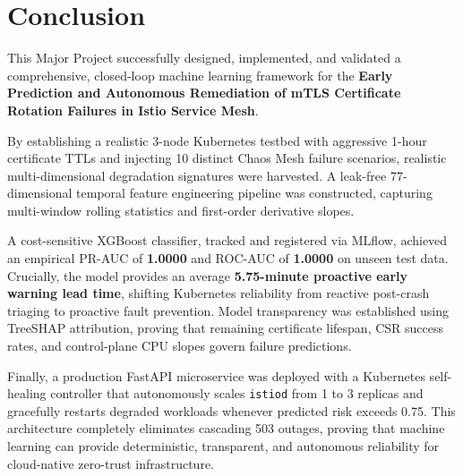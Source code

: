 \documentclass[12pt,a4paper]{report}
\begin{document}
\section{Conclusion}
This Major Project successfully designed, implemented, and validated a comprehensive, closed-loop machine learning framework for the \textbf{Early Prediction and Autonomous Remediation of mTLS Certificate Rotation Failures in Istio Service Mesh}. 

By establishing a realistic 3-node Kubernetes testbed with aggressive 1-hour certificate TTLs and injecting 10 distinct Chaos Mesh failure scenarios, realistic multi-dimensional degradation signatures were harvested. A leak-free 77-dimensional temporal feature engineering pipeline was constructed, capturing multi-window rolling statistics and first-order derivative slopes. 

A cost-sensitive XGBoost classifier, tracked and registered via MLflow, achieved an empirical PR-AUC of \textbf{1.0000} and ROC-AUC of \textbf{1.0000} on unseen test data. Crucially, the model provides an average \textbf{5.75-minute proactive early warning lead time}, shifting Kubernetes reliability from reactive post-crash triaging to proactive fault prevention. Model transparency was established using TreeSHAP attribution, proving that remaining certificate lifespan, CSR success rates, and control-plane CPU slopes govern failure predictions. 

Finally, a production FastAPI microservice was deployed with a Kubernetes self-healing controller that autonomously scales \texttt{istiod} from 1 to 3 replicas and gracefully restarts degraded workloads whenever predicted risk exceeds 0.75. This architecture completely eliminates cascading 503 outages, proving that machine learning can provide deterministic, transparent, and autonomous reliability for cloud-native zero-trust infrastructure.
\end{document}
